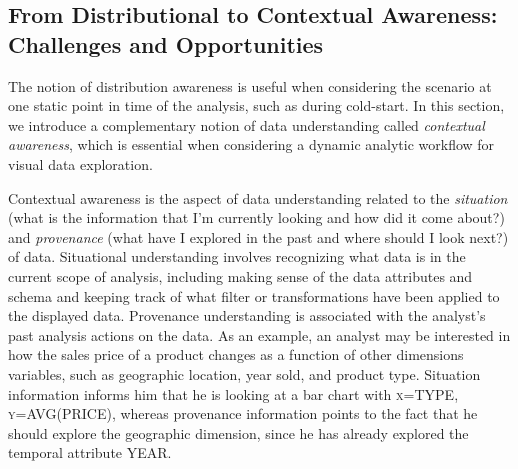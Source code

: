 \subsection{From Distributional to Contextual Awareness: Challenges and Opportunities}
\par The notion of distribution awareness is useful when considering the scenario at one static point in time of the analysis, such as during cold-start. In this section, we introduce a complementary notion of data understanding called \textit{contextual awareness}, which is essential when considering a dynamic analytic workflow for visual data exploration.
\par Contextual awareness is the aspect of data understanding related to the \textit{situation} (what is the information that I'm currently looking and how did it come about?) and \textit{provenance} (what have I explored in the past and where should I look next?) of data. Situational understanding involves recognizing what data is in the current scope of analysis, including making sense of the data attributes and schema and keeping track of what filter or transformations have been applied to the displayed data. Provenance understanding is associated with the analyst's past analysis actions on the data. As an example, an analyst may be interested in how the sales price of a product changes as a function of other dimensions variables, such as geographic location, year sold, and product type. Situation information informs him that he is looking at a bar chart with \textsc{x=TYPE}, \textsc{y=AVG(PRICE)}, whereas provenance information points to the fact that he should explore the geographic dimension, since he has already explored the temporal attribute \textsc{YEAR}.
